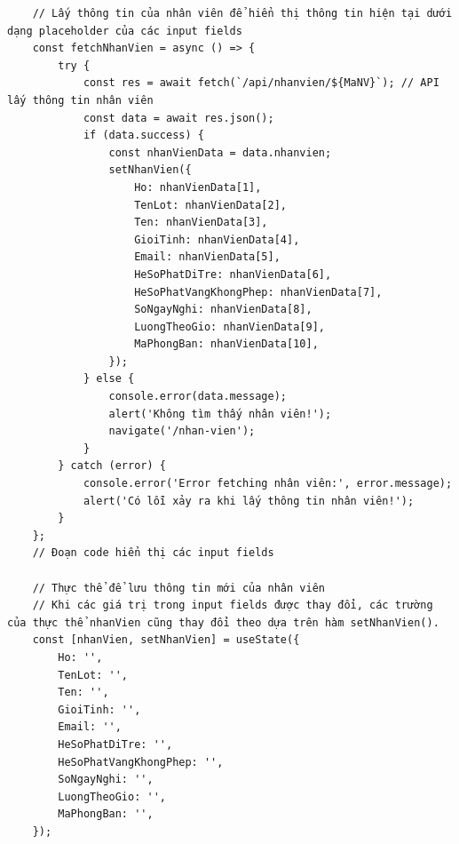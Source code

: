 \begin{verbatim}
    // Lấy thông tin của nhân viên để hiển thị thông tin hiện tại dưới dạng placeholder của các input fields
    const fetchNhanVien = async () => {
        try {
            const res = await fetch(`/api/nhanvien/${MaNV}`); // API lấy thông tin nhân viên
            const data = await res.json();
            if (data.success) {
                const nhanVienData = data.nhanvien;
                setNhanVien({
                    Ho: nhanVienData[1],
                    TenLot: nhanVienData[2],
                    Ten: nhanVienData[3],
                    GioiTinh: nhanVienData[4],
                    Email: nhanVienData[5],
                    HeSoPhatDiTre: nhanVienData[6],
                    HeSoPhatVangKhongPhep: nhanVienData[7],
                    SoNgayNghi: nhanVienData[8],
                    LuongTheoGio: nhanVienData[9],
                    MaPhongBan: nhanVienData[10],
                });
            } else {
                console.error(data.message);
                alert('Không tìm thấy nhân viên!');
                navigate('/nhan-vien');
            }
        } catch (error) {
            console.error('Error fetching nhân viên:', error.message);
            alert('Có lỗi xảy ra khi lấy thông tin nhân viên!');
        }
    };
    // Đoạn code hiển thị các input fields

    // Thực thể để lưu thông tin mới của nhân viên
    // Khi các giá trị trong input fields được thay đổi, các trường của thực thể nhanVien cũng thay đổi theo dựa trên hàm setNhanVien().
    const [nhanVien, setNhanVien] = useState({
        Ho: '',
        TenLot: '',
        Ten: '',
        GioiTinh: '',
        Email: '',
        HeSoPhatDiTre: '',
        HeSoPhatVangKhongPhep: '',
        SoNgayNghi: '',
        LuongTheoGio: '',
        MaPhongBan: '',
    });
\end{verbatim}
